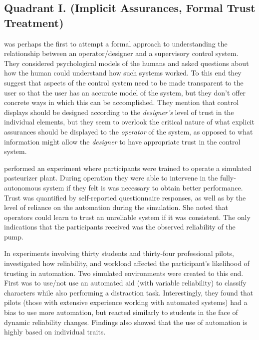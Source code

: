 \subsection{Quadrant I. (Implicit Assurances, Formal Trust Treatment)}\label{sec:q1}
\citet{Sheridan1984-kx} was perhaps the first to attempt a formal approach to understanding the relationship between an operator/designer and a supervisory control system.  They considered psychological models of the humans and asked questions about how the human could understand how such systems worked. To this end they suggest that aspects of the control system need to be made transparent to the user so that the user has an accurate model of the system, but they don't offer concrete ways in which this can be accomplished. They mention that control displays should be designed according to the \emph{designer's} level of trust in the individual elements, but they seem to overlook the critical nature of what explicit assurances should be displayed to the \emph{operator} of the system, as opposed to what information might allow the \emph{designer} to have appropriate trust in the control system.

\citet{Muir1996-gt} performed an experiment where participants were trained to operate a simulated pasteurizer plant. During operation they were able to intervene in the fully-autonomous system if they felt is was necessary to obtain better performance. Trust was quantified by self-reported questionnaire responses, as well as by the level of reliance on the automation during the simulation. She noted that operators could learn to trust an unreliable system if it was consistent. The only indications that the participants received was the observed reliability of the pump. 

In experiments involving thirty students and thirty-four professional pilots, \citet{Riley1996-qm} investigated how reliability, and workload affected the participant's likelihood of trusting in automation. Two simulated environments were created to this end. First was to use/not use an automated aid (with variable reliability) to classify characters while also performing a distraction task. Interestingly, they found that pilots (those with extensive experience working with automated systems) had a bias to use more automation, but reacted similarly to students in the face of dynamic reliability changes. Findings also showed that the use of automation is highly based on individual traits.

